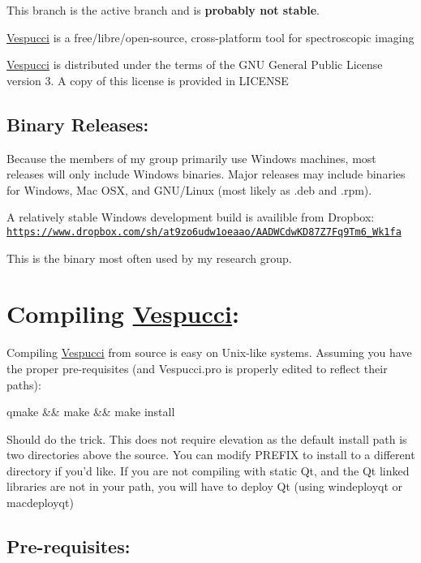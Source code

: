 This branch is the active branch and is {\bfseries probably not stable}.

\hyperlink{namespace_vespucci}{Vespucci} is a free/libre/open-\/source, cross-\/platform tool for spectroscopic imaging

\hyperlink{namespace_vespucci}{Vespucci} is distributed under the terms of the G\+N\+U General Public License version 3. A copy of this license is provided in L\+I\+C\+E\+N\+S\+E

\subsection*{Binary Releases\+: }

Because the members of my group primarily use Windows machines, most releases will only include Windows binaries. Major releases may include binaries for Windows, Mac O\+S\+X, and G\+N\+U/\+Linux (most likely as .deb and .rpm).

A relatively stable Windows development build is availible from Dropbox\+: \href{https://www.dropbox.com/sh/at9zo6udw1oeaao/AADWCdwKD87Z7Fq9Tm6_Wk1fa}{\tt https\+://www.\+dropbox.\+com/sh/at9zo6udw1oeaao/\+A\+A\+D\+W\+Cdw\+K\+D87\+Z7\+Fq9\+Tm6\+\_\+\+Wk1fa}

This is the binary most often used by my research group.

\section*{Compiling \hyperlink{namespace_vespucci}{Vespucci}\+: }

Compiling \hyperlink{namespace_vespucci}{Vespucci} from source is easy on Unix-\/like systems. Assuming you have the proper pre-\/requisites (and Vespucci.\+pro is properly edited to reflect their paths)\+: \begin{DoxyVerb}qmake && make && make install
\end{DoxyVerb}


Should do the trick. This does not require elevation as the default install path is two directories above the source. You can modify P\+R\+E\+F\+I\+X to install to a different directory if you'd like. If you are not compiling with static Qt, and the Qt linked libraries are not in your path, you will have to deploy Qt (using windeployqt or macdeployqt)

\subsection*{Pre-\/requisites\+: }

